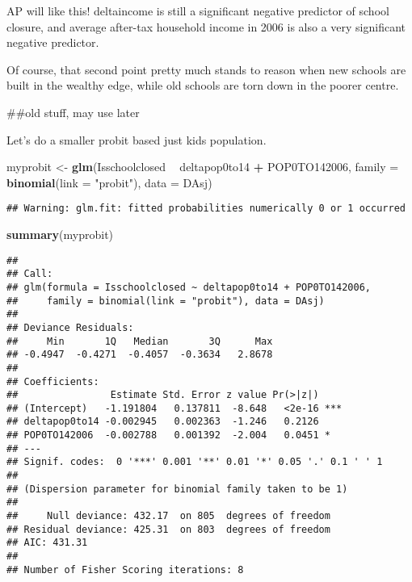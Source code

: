\documentclass[]{article}
\newenvironment{Shaded}{\begin{snugshade}}{\end{snugshade}}
\newcommand{\DataTypeTok}[1]{\textcolor[rgb]{0.13,0.29,0.53}{#1}}
\newcommand{\KeywordTok}[1]{\textcolor[rgb]{0.13,0.29,0.53}{\textbf{#1}}}
\newcommand{\NormalTok}[1]{#1}
\newcommand{\OperatorTok}[1]{\textcolor[rgb]{0.81,0.36,0.00}{\textbf{#1}}}
\newcommand{\StringTok}[1]{\textcolor[rgb]{0.31,0.60,0.02}{#1}}
\begin{document}
AP will like this! deltaincome is still a significant negative predictor
of school closure, and average after-tax household income in 2006 is
also a very significant negative predictor.

Of course, that second point pretty much stands to reason when new
schools are built in the wealthy edge, while old schools are torn down
in the poorer centre.

\#\#old stuff, may use later

Let's do a smaller probit based just kids population.

\begin{Shaded}
\begin{Highlighting}[]
\NormalTok{myprobit <-}\StringTok{ }\KeywordTok{glm}\NormalTok{(Isschoolclosed }\OperatorTok{~}\StringTok{ }\NormalTok{deltapop0to14 }\OperatorTok{+}\StringTok{ }\NormalTok{POP0TO142006, }\DataTypeTok{family =} \KeywordTok{binomial}\NormalTok{(}\DataTypeTok{link =} \StringTok{"probit"}\NormalTok{), }\DataTypeTok{data =}\NormalTok{ DAsj)}
\end{Highlighting}
\end{Shaded}

\begin{verbatim}
## Warning: glm.fit: fitted probabilities numerically 0 or 1 occurred
\end{verbatim}

\begin{Shaded}
\begin{Highlighting}[]
\KeywordTok{summary}\NormalTok{(myprobit)}
\end{Highlighting}
\end{Shaded}

\begin{verbatim}
## 
## Call:
## glm(formula = Isschoolclosed ~ deltapop0to14 + POP0TO142006, 
##     family = binomial(link = "probit"), data = DAsj)
## 
## Deviance Residuals: 
##     Min       1Q   Median       3Q      Max  
## -0.4947  -0.4271  -0.4057  -0.3634   2.8678  
## 
## Coefficients:
##                Estimate Std. Error z value Pr(>|z|)    
## (Intercept)   -1.191804   0.137811  -8.648   <2e-16 ***
## deltapop0to14 -0.002945   0.002363  -1.246   0.2126    
## POP0TO142006  -0.002788   0.001392  -2.004   0.0451 *  
## ---
## Signif. codes:  0 '***' 0.001 '**' 0.01 '*' 0.05 '.' 0.1 ' ' 1
## 
## (Dispersion parameter for binomial family taken to be 1)
## 
##     Null deviance: 432.17  on 805  degrees of freedom
## Residual deviance: 425.31  on 803  degrees of freedom
## AIC: 431.31
## 
## Number of Fisher Scoring iterations: 8
\end{verbatim}
\end{document}
